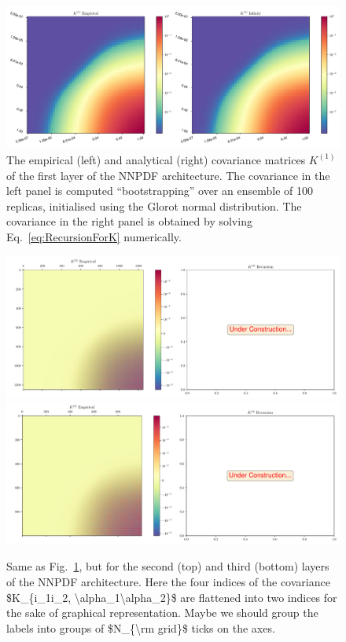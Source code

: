\begin{figure}[t!]
    \centering
    \includegraphics[scale=0.4]{figs/K1_correlations.pdf}
    \caption{The empirical (left) and analytical (right) covariance matrices $K^{(1)}$ of the first layer
    of the NNPDF architecture. The covariance in the left panel is computed ``bootstrapping'' over an
    ensemble of 100 replicas, initialised using the Glorot normal distribution. The covariance in the right
    panel is obtained by solving Eq.~\eqref{eq:RecursionForK} numerically.
    \label{Fig:KRecursionOne}
    }
\end{figure}

\begin{figure}[t!]
    \centering
    \includegraphics[scale=0.4]{figs/K2_correlations.pdf}
    \includegraphics[scale=0.4]{figs/K3_correlations.pdf}
    \caption{Same as Fig.~\ref{Fig:KRecursionOne}, but for the second (top) and third (bottom) layers of the
    NNPDF architecture.
    \ac{Here the four indices of the covariance $K_{i_1i_2, \alpha_1\alpha_2}$ are flattened into
    two indices for the sake of graphical representation. Maybe we should group the labels into groups of
    $N_{\rm grid}$ ticks on the axes.}
    \label{Fig:KRecursionTwo}
    }
\end{figure}

